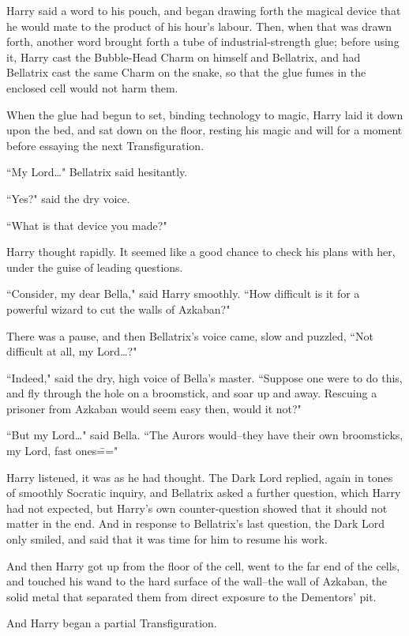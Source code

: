 Harry said a word to his pouch, and began drawing forth the magical device that he would mate to the product of his hour's labour. Then, when that was drawn forth, another word brought forth a tube of industrial-strength glue; before using it, Harry cast the Bubble-Head Charm on himself and Bellatrix, and had Bellatrix cast the same Charm on the snake, so that the glue fumes in the enclosed cell would not harm them.

When the glue had begun to set, binding technology to magic, Harry laid it down upon the bed, and sat down on the floor, resting his magic and will for a moment before essaying the next Transfiguration.

``My Lord{\ldots}" Bellatrix said hesitantly.

``Yes?" said the dry voice.

``What is that device you made?"

Harry thought rapidly. It seemed like a good chance to check his plans with her, under the guise of leading questions.

``Consider, my dear Bella," said Harry smoothly. ``How difficult is it for a powerful wizard to cut the walls of Azkaban?"

There was a pause, and then Bellatrix's voice came, slow and puzzled, ``Not difficult at all, my Lord{\ldots}?"

``Indeed," said the dry, high voice of Bella's master. ``Suppose one were to do this, and fly through the hole on a broomstick, and soar up and away. Rescuing a prisoner from Azkaban would seem easy then, would it not?"

``But my Lord{\ldots}" said Bella. ``The Aurors would\---they have their own broomsticks, my Lord, fast ones\==="

Harry listened, it was as he had thought. The Dark Lord replied, again in tones of smoothly Socratic inquiry, and Bellatrix asked a further question, which Harry had not expected, but Harry's own counter-question showed that it should not matter in the end. And in response to Bellatrix's last question, the Dark Lord only smiled, and said that it was time for him to resume his work.

And then Harry got up from the floor of the cell, went to the far end of the cells, and touched his wand to the hard surface of the wall\---the wall of Azkaban, the solid metal that separated them from direct exposure to the Dementors' pit.

And Harry began a partial Transfiguration.

